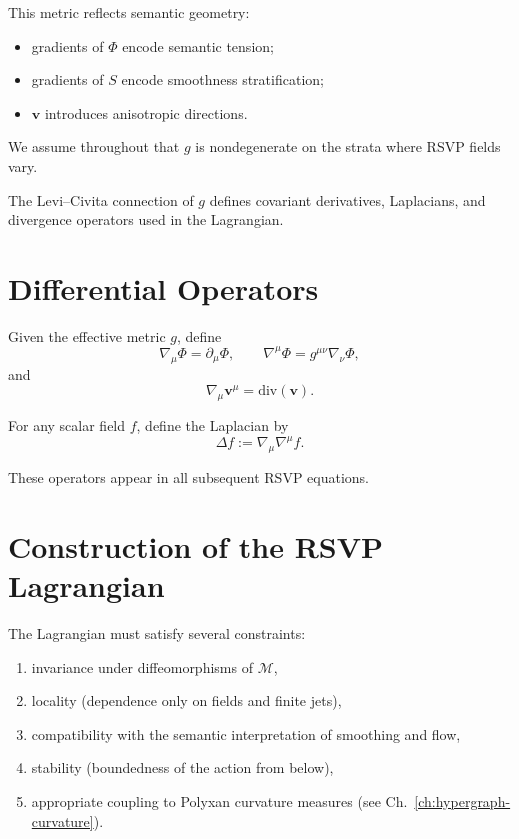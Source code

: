 This metric reflects semantic geometry:
\begin{itemize}
\item gradients of $\Phi$ encode semantic tension;
\item gradients of $S$ encode smoothness stratification;
\item $\mathbf{v}$ introduces anisotropic directions.
\end{itemize}

We assume throughout that $g$ is nondegenerate on the strata where RSVP fields
vary.

The Levi--Civita connection of $g$ defines covariant derivatives, Laplacians,
and divergence operators used in the Lagrangian.

\section{Differential Operators}

\begin{definition}
Given the effective metric $g$, define  
\[
\nabla_\mu \Phi = \partial_\mu \Phi, \qquad
\nabla^\mu \Phi = g^{\mu\nu} \nabla_\nu \Phi,
\]
and
\[
\nabla_\mu \mathbf{v}^\mu = \mathrm{div}(\mathbf{v}).
\]
\end{definition}

\begin{definition}
For any scalar field $f$, define the Laplacian by
\[
\Delta f := \nabla_\mu \nabla^\mu f .
\]
\end{definition}

These operators appear in all subsequent RSVP equations.

\section{Construction of the RSVP Lagrangian}

The Lagrangian must satisfy several constraints:
\begin{enumerate}[label=(\roman*)]
\item invariance under diffeomorphisms of $\mathcal{M}$,
\item locality (dependence only on fields and finite jets),
\item compatibility with the semantic interpretation of smoothing and flow,
\item stability (boundedness of the action from below),
\item appropriate coupling to Polyxan curvature measures (see Ch.~\ref{ch:hypergraph-curvature}).
\end{enumerate}

